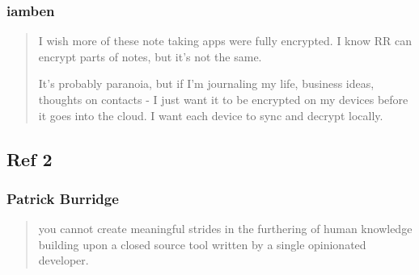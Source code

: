 \documentclass[11pt]{article}
\begin{document}
\subsubsection{iamben}
\label{sec:org1f41c06}
\begin{quote}
I wish more of these note taking apps were fully encrypted. I know RR can encrypt parts of notes, but it's not the same.

It's probably paranoia, but if I'm journaling my life, business ideas, thoughts on contacts - I just want it to be encrypted on my devices before it goes into the cloud. I want each device to sync and decrypt locally.
\end{quote}

\subsection{Ref 2}
\label{sec:orgedd3c47}
\subsubsection{Patrick Burridge}
\label{sec:orgf27c627}
\begin{quote}
you cannot create meaningful strides in the furthering of human knowledge building upon a closed source tool written by a single opinionated developer.
\end{quote}
\end{document}
